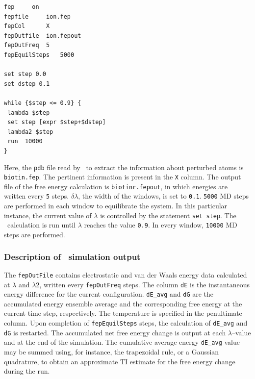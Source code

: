 \begin{verbatim}
fep		on  
fepfile		ion.fep
fepCol		X
fepOutfile	ion.fepout
fepOutFreq	5
fepEquilSteps	5000

set step 0.0
set dstep 0.1

while {$step <= 0.9} {
 lambda $step
 set step [expr $step+$dstep]
 lambda2 $step
 run  10000
}
\end{verbatim}

\noindent
Here, the {\tt pdb} file read by \NAMD\ to extract the information
about perturbed atoms is {\tt biotin.fep}. The pertinent information 
is present in the {\tt X} column. The output file of the free energy
calculation is {\tt biotinr.fepout}, in which energies are written
every {\tt 5} steps.
$\delta \lambda$, the width of the windows, is set to {\tt 0.1}.
{\tt 5000} MD steps are performed in each window to
equilibrate the system. In this particular instance, 
the current value of $\lambda$
is controlled by the statement {\tt set step}. 
The \FEP\ calculation is run until $\lambda$ reaches the
value {\tt 0.9}. In every window, {\tt 10000} MD steps
are performed.


\subsubsection{Description of \FEP\ simulation output }

The {\tt fepOutFile} contains electrostatic and van der Waals energy
data calculated at $\lambda$ and $\lambda2$, written every
{\tt fepOutFreq} steps. The column {\tt dE} is the instantaneous energy
difference for the current configuration. {\tt dE\_avg} and {\tt dG}
are the accumulated energy ensemble average and the corresponding
free energy at the current time step, respectively.
The temperature is specified in the penultimate column. Upon completion
of {\tt fepEquilSteps} steps, the calculation of {\tt dE\_avg} and 
{\tt dG} is restarted. The accumulated net free energy change is output
at each $\lambda$--value and at the end of the simulation. The cumulative
average energy {\tt dE\_avg} value may be summed using, for instance, the 
trapezoidal rule, or a Gaussian quadrature, to obtain an approximate 
TI estimate for the free energy change during the run.


